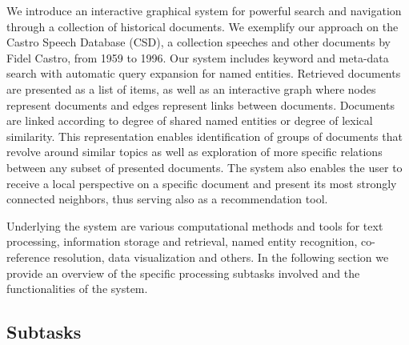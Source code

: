 We introduce an interactive graphical system for powerful search and navigation through a collection of historical documents. 
We exemplify our approach on the Castro Speech Database  (CSD), a collection 
speeches and other documents by Fidel Castro, from 1959 to 1996. Our system includes keyword and meta-data search with automatic query 
expansion for named entities. Retrieved documents are presented as a list of items, as well as an interactive graph where nodes represent 
documents and edges represent links between documents. Documents are linked according to degree of shared named entities or degree of lexical 
similarity. This representation enables identification of groups of documents that revolve around similar topics as well as exploration of 
more specific relations between any subset of presented documents. The system also enables the user to receive a local perspective on a 
specific document and present its most strongly connected neighbors, thus serving also as a recommendation tool. 

Underlying the system are various computational methods and tools for text processing, 
information storage and retrieval, named entity recognition, co-reference resolution, 
data visualization and others. In the following section we provide an overview of the specific processing subtasks 
involved and the functionalities of the system.

\subsection{Subtasks}
\label{sec:subtasks}
